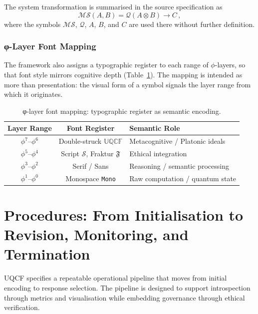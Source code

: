 \documentclass[12pt]{article}
\begin{document}
The system transformation is summarised in the source specification as
\begin{equation}
\mathcal{MS}(A,B) = \mathcal{Q}(A \otimes B) \rightarrow C\,,
\end{equation}
where the symbols $\mathcal{MS}$, $\mathcal{Q}$, $A$, $B$, and $C$ are used there without further definition.

\subsubsection{φ-Layer Font Mapping}
The framework also assigns a typographic register to each range of $\phi$-layers, so that font style mirrors cognitive depth (Table~\ref{tab:font-mapping}). The mapping is intended as more than presentation: the visual form of a symbol signals the layer range from which it originates.

\begin{table}[h]
\centering
\begin{tabular}{ccl}
\toprule
Layer Range & Font Register & Semantic Role \\
\midrule
$\phi^7$--$\phi^6$ & Double-struck $\mathbb{U}\mathbb{Q}\mathbb{C}\mathbb{F}$ & Metacognitive / Platonic ideals \\
$\phi^5$--$\phi^4$ & Script $\mathcal{S}$, Fraktur $\mathfrak{F}$ & Ethical integration \\
$\phi^3$--$\phi^2$ & Serif / Sans & Reasoning / semantic processing \\
$\phi^1$--$\phi^0$ & Monospace \texttt{Mono} & Raw computation / quantum state \\
\bottomrule
\end{tabular}
\caption{φ-layer font mapping: typographic register as semantic encoding.}
\label{tab:font-mapping}
\end{table}

\section{Procedures: From Initialisation to Revision, Monitoring, and Termination}\label{sec:procedures}
UQCF specifies a repeatable operational pipeline that moves from initial encoding to response selection. The pipeline is designed to support introspection through metrics and visualisation while embedding governance through ethical verification.
\end{document}
